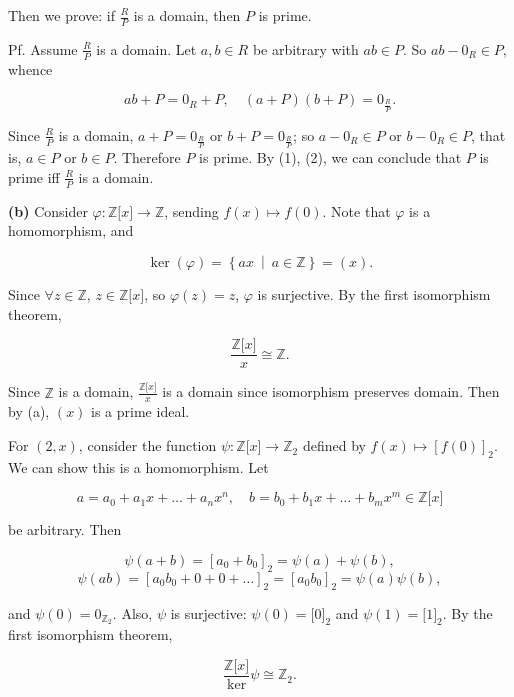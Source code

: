 Then we prove: if \(\frac{R}{P}\) is a domain, then \(P\) is prime.

Pf. Assume \(\frac{R}{P}\) is a domain. Let \(a,b \in R\) be arbitrary with \(ab \in P\). So \(ab - 0_{R} \in P\), whence

\[ab + P = 0_{R} + P,\quad\left( {a + P} \right)\left( {b + P} \right) = 0_{\frac{R}{P}}.\]

Since \(\frac{R}{P}\) is a domain, \(a + P = 0_{\frac{R}{P}}\) or \(b + P = 0_{\frac{R}{P}}\); so \(a - 0_{R} \in P\) or \(b - 0_{R} \in P\), that is, \(a \in P\) or \(b \in P\). Therefore \(P\) is prime. By (1), (2), we can conclude that \(P\) is prime iff \(\frac{R}{P}\) is a domain.

\textbf{(b)} Consider \(\varphi:\mathbb{Z}\lbrack x\rbrack\rightarrow\mathbb{Z}\), sending \(f(x)\mapsto f(0)\). Note that \(\varphi\) is a homomorphism, and

\[\ker(\varphi) = \left\{ ax\  \middle| \ a \in \mathbb{Z} \right\} = (x).\]

Since \(\forall z \in \mathbb{Z}\), \(z \in \mathbb{Z}\lbrack x\rbrack\), so \(\varphi(z) = z\), \(\varphi\) is surjective. By the first isomorphism theorem,

\[\frac{\mathbb{Z}\lbrack x\rbrack}{x} \cong \mathbb{Z}.\]

Since \(\mathbb{Z}\) is a domain, \(\frac{\mathbb{Z}\lbrack x\rbrack}{x}\) is a domain since isomorphism preserves domain. Then by (a), \((x)\) is a prime ideal.

For \(\left( {2,x} \right)\), consider the function \(\psi:\mathbb{Z}\lbrack x\rbrack\rightarrow\mathbb{Z}_{2}\) defined by \(f(x)\mapsto\left\lbrack {f(0)} \right\rbrack_{2}\). We can show this is a homomorphism. Let

\[a = a_{0} + a_{1}x + \ldots + a_{n}x^{n},\quad b = b_{0} + b_{1}x + \ldots + b_{m}x^{m} \in \mathbb{Z}\lbrack x\rbrack\]

be arbitrary. Then

\[\psi\left( {a + b} \right) = \left\lbrack {a_{0} + b_{0}} \right\rbrack_{2} = \psi(a) + \psi(b),\]\[\psi\left( {ab} \right) = \left\lbrack {a_{0}b_{0} + 0 + 0 + \ldots} \right\rbrack_{2} = \left\lbrack {a_{0}b_{0}} \right\rbrack_{2} = \psi(a)\psi(b),\]

and \(\psi(0) = 0_{\mathbb{Z}_{2}}\). Also, \(\psi\) is surjective: \(\psi(0) = \lbrack 0\rbrack_{2}\) and \(\psi(1) = \lbrack 1\rbrack_{2}\). By the first isomorphism theorem,

\[\frac{\mathbb{Z}\lbrack x\rbrack}{\ker}\psi \cong \mathbb{Z}_{2}.\]


